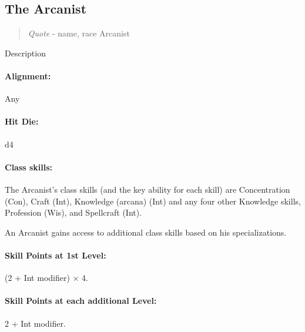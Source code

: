 \subsection[Arcanist]{The Arcanist}
\begin{quote}
\emph{Quote}
- name, race Arcanist
\end{quote}
Description

\paragraph{Alignment:} Any
\paragraph{Hit Die:} d4
\paragraph{Class skills:}
The Arcanist's class skills (and the key ability for each skill) are Concentration (Con), Craft (Int), Knowledge (arcana) (Int) and any four other Knowledge skills, Profession (Wis), and Spellcraft (Int). 

An Arcanist gains access to additional class skills based on his specializations.

\paragraph{Skill Points at 1st Level:} (2 + Int modifier) $\times$ 4.
\paragraph{Skill Points at each additional Level:} 2 + Int modifier.

